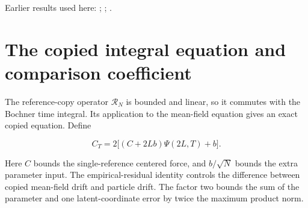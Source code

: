 \documentclass[11pt,a4paper]{article}
\begin{document}
Earlier results used here: \cite[Section~3.13.2]{LangevinLean2026ULASC}; \cite[Section~3.13.5]{LangevinLean2026ULASC}; \cite[Section~3.1.1]{LangevinLean2026IPLA}.

\section{\texorpdfstring{The copied integral equation and comparison coefficient}{The copied integral equation and comparison coefficient}}


The reference-copy operator \(\mathcal R_N\) is bounded and linear, so it commutes with the Bochner time integral. Its application to the mean-field equation gives an exact copied equation. Define

\[C_T=2\big[(C+2Lb)\Psi(2L,T)+b\big].\]

Here \(C\) bounds the single-reference centered force, and \(b/\sqrt N\) bounds the extra parameter input. The empirical-residual identity controls the difference between copied mean-field drift and particle drift. The factor two bounds the sum of the parameter and one latent-coordinate error by twice the maximum product norm.
\end{document}
